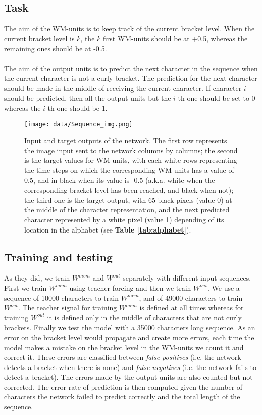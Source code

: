 \subsection{Task}

The aim of the WM-units is to keep track of the current bracket level. When the current bracket level is $\mathit{k}$, the $\mathit{k}$ first WM-units should be at +0.5, whereas the remaining ones should be at -0.5. \\
\\
The aim of the output units is to predict the next character in the sequence when the current character is not a curly bracket.
The prediction for the next character should be made in the middle of receiving the current character. If character $i$ should be predicted, then all the output units but the $i$-th one should be set to 0 whereas the $i$-th one should be 1. \\

\begin{figure}[h]
    \centering
    \texttt{[image: data/Sequence\_img.png]}
    \caption{Input and target outputs of the network. The first row represents the image input sent to the network columns by columns; the second is the target values for WM-units, with each white rows representing the time steps on which the corresponding WM-units has a value of 0.5, and in black when its value is -0.5 (a.k.a. white when the corresponding bracket level has been reached, and black when not); the third one is the target output, with 65 black pixels (value 0) at the middle of the character representation, and the next predicted character represented by a white pixel (value 1) depending of its location in the alphabet (see \textbf{Table \ref{tab:alphabet}}).}
    \label{fig:archi tecture}
\end{figure}

\subsection{Training and testing}

As they did, we train $W^{mem}$ and $W^{out}$ separately with different input sequences.
First we train $W^{mem}$ using teacher forcing and then we train $W^{out}$.
We use a sequence of 10000 characters to train $W^{mem}$, and of 49000 characters to train $W^{out}$.
The teacher signal for training $W^{mem}$ is defined at all times whereas for training $W^{out}$ it is defined only in the middle of characters that are not curly brackets.
Finally we test the model with a 35000 characters long sequence.
As an error on the bracket level would propagate and create more errors, each time the model makes a mistake on the bracket level in the WM-units we count it and correct it.
These errors are classified between \textit{false positives} (i.e. the network detects a bracket when there is none) and \textit{false negatives} (i.e. the network fails to detect a bracket).
The errors made by the output units are also counted but not corrected. The error rate of prediction is then computed given the number of characters the network failed to predict correctly and the total length of the sequence.


